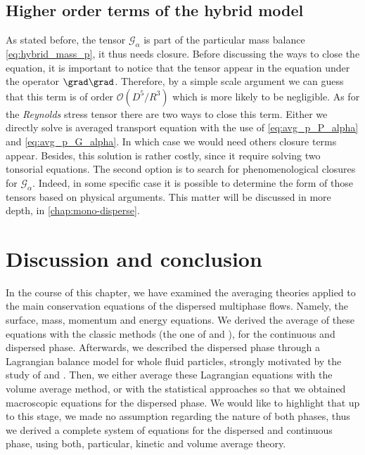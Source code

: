\subsection{Higher order terms of the hybrid model}

As stated before, the tensor $\mathcal{G}_\alpha$ is part of the particular mass balance \ref{eq:hybrid_mass_p}, it thus needs closure. 
Before discussing the ways to close the equation, it is important to notice that the tensor appear in the equation under the operator $\grad \grad$. 
Therefore, by a simple scale argument we can guess that this term is of order $\mathcal{O}(D^5 / R^3)$ which is more likely to be negligible. 
As for the \textit{Reynolds} stress tensor there are two ways to close this term. 
Either we directly solve is averaged transport equation with the use of \ref{eq:avg_p_P_alpha} and \ref{eq:avg_p_G_alpha}.
In which case we would need others closure terms appear. 
Besides, this solution is rather costly, since it require solving two tonsorial equations. 
The second option is to search for phenomenological closures for $\mathcal{G}_\alpha$. 
Indeed, in some specific case it is possible to determine the form of those tensors based on physical arguments. 
This matter will be discussed in more depth, in \ref{chap:mono-disperse}.



\section{Discussion and conclusion}

In the course of this chapter, we have examined the averaging theories applied to the main conservation equations of the dispersed multiphase flows. 
Namely, the surface, mass, momentum and energy equations. 
We derived the average of these equations with the classic methods (the one of \citet{drew1983mathematical} and \citet{kataoka1986local}), for the continuous  and dispersed phase. 
Afterwards, we described the dispersed phase through a Lagrangian balance model for whole fluid particles, strongly motivated by the study of \cite{morel2015mathematical} and \citet{zaepffel2011modelisation}. 
Then, we either average these Lagrangian equations with the volume average method, or with the statistical approaches so that we obtained macroscopic equations for the dispersed phase. 
We would like to highlight that up to this stage, we made no assumption regarding the nature of both phases, thus we derived a complete system of equations for the dispersed and continuous phase, using both, particular, kinetic and volume average theory.

